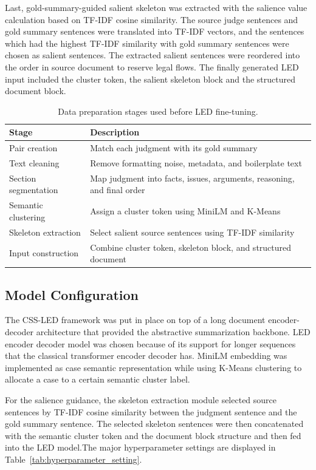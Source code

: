 \documentclass[11pt, a4paper]{article}
\theoremstyle{plain}%
\theoremstyle{remark}%
\theoremstyle{definition}%
\begin{document}
Last, gold-summary-guided salient skeleton was extracted with the salience value calculation based on TF-IDF cosine similarity. The source judge sentences and gold summary sentences were translated into TF-IDF vectors, and the sentences which had the highest TF-IDF similarity with gold summary sentences were chosen as salient sentences. The extracted salient sentences were reordered into the order in source document to reserve legal flows. The finally generated LED input included the cluster token, the salient skeleton block and the structured document block.

\begin{table}[H]
\centering
\caption{Data preparation stages used before LED fine-tuning.}
\begin{tabular}{ll}
\hline
Stage & Description \\
\hline
Pair creation & Match each judgment with its gold summary \\
Text cleaning & Remove formatting noise, metadata, and boilerplate text \\
Section segmentation & Map judgment into facts, issues, arguments, reasoning, and final order \\
Semantic clustering & Assign a cluster token using MiniLM and K-Means \\
Skeleton extraction & Select salient source sentences using TF-IDF similarity \\
Input construction & Combine cluster token, skeleton block, and structured document \\
\hline
\end{tabular}
\label{tab:data_preparation}
\end{table}

\subsection{Model Configuration}
The CSS-LED framework was put in place on top of a long document encoder-decoder architecture that provided the abstractive summarization backbone. LED encoder decoder model was chosen because of its support for longer sequences that the classical transformer encoder decoder has. MiniLM embedding was implemented as case semantic representation while using K-Means clustering to allocate a case to a certain semantic cluster label.

For the salience guidance, the skeleton extraction module selected source sentences by TF-IDF cosine similarity between the judgment sentence and the gold summary sentence. The selected skeleton sentences were then concatenated with the semantic cluster token and the document block structure and then fed into the LED model.The major hyperparameter settings are displayed in Table~\ref{tab:hyperparameter_setting}.
\end{document}
